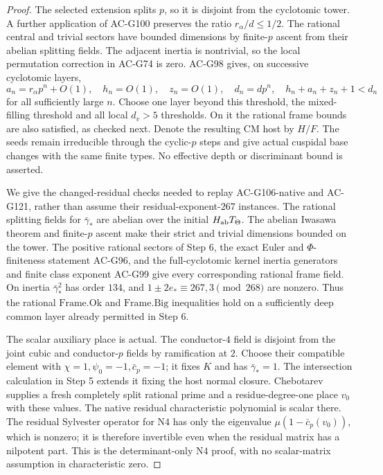 \begin{proof}
The selected extension splits \(p\), so it is disjoint from
the cyclotomic tower.  A further application of AC-G100
preserves the ratio \(r_\alpha/d\le1/2\).
The rational central and trivial sectors have bounded
dimensions by finite-\(p\) ascent from their abelian splitting
fields.  The adjacent inertia is nontrivial, so the local
permutation correction in AC-G74 is zero.
AC-G98 gives, on successive cyclotomic layers,
\[
 a_n=r_\alpha p^n+O(1),\quad h_n=O(1),\quad z_n=O(1),
 \quad d_n=dp^n,\quad
                 h_n+a_n+z_n+1<d_n
 \tag{G132.22}
\]
for all sufficiently large \(n\).
Choose one layer beyond this threshold, the mixed-filling
threshold and all local \(d_v>5\) thresholds.
On it the rational frame bounds are also satisfied, as
checked next.  Denote the resulting CM host by \(H/F\).
The seeds remain irreducible through the cyclic-\(p\) steps
and give actual cuspidal base changes with the same finite
types.  No effective depth or discriminant bound is asserted.

We give the changed-residual checks needed to replay
AC-G106-native and AC-G121, rather than assume their
residual-exponent-\(267\) instances.
The rational splitting fields for \(\bar\gamma_*\) are abelian
over the initial \(H_{\rm ab}T_\Theta\).
The abelian Iwasawa theorem and finite-\(p\) ascent make their
strict and trivial dimensions bounded on the tower.
The positive rational sectors of Step 6, the exact Euler and
\(\Phi\)-finiteness statement AC-G96, and the full-cyclotomic
kernel inertia generators and finite class exponent AC-G99
give every corresponding rational frame field.
On inertia \(\bar\gamma_*^2\) has order \(134\), and
\(1\pm2e_*\equiv267,3\pmod{268}\) are nonzero.
Thus the rational \(\mathrm{Frame.Ok}\) and
\(\mathrm{Frame.Big}\) inequalities hold on a sufficiently
deep common layer already permitted in Step 6.

The scalar auxiliary place is actual.
The conductor-\(4\) field is disjoint from the joint cubic
and conductor-\(p\) fields by ramification at \(2\).
Choose their compatible element with
\(\chi=1,\psi_0=-1,\bar c_p=-1\); it fixes \(K\) and has
\(\bar\gamma_*=1\).
The intersection calculation in Step 5 extends it fixing
the host normal closure.  Chebotarev supplies a fresh
completely split rational prime and a residue-degree-one
place \(v_0\) with these values.
The native residual characteristic polynomial is scalar
there.  The residual Sylvester operator for \(\mathrm{N4}\)
has only the eigenvalue
\(\mu(1-\bar c_p(v_0))\), which is nonzero; it is therefore
invertible even when the residual matrix has a nilpotent part.
This is the determinant-only \(\mathrm{N4}\) proof, with
no scalar-matrix assumption in characteristic zero.


\end{proof}
